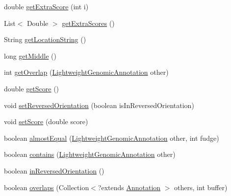 \begin{DoxyCompactItemize}
\item 
double \hyperlink{classbroad_1_1core_1_1annotation_1_1_basic_lightweight_annotation_a29f10b679f86820e035e1f8071ce552d}{get\+Extra\+Score} (int i)
\item 
List$<$ Double $>$ \hyperlink{classbroad_1_1core_1_1annotation_1_1_basic_lightweight_annotation_a2730f74d634af4832bc9a7c4071316cb}{get\+Extra\+Scores} ()
\item 
String \hyperlink{classbroad_1_1core_1_1annotation_1_1_basic_lightweight_annotation_a768a87c705c0f6abc1025dc776486cc9}{get\+Location\+String} ()
\item 
long \hyperlink{classbroad_1_1core_1_1annotation_1_1_basic_lightweight_annotation_ae3d92f493e84b236a38aac116bff28d3}{get\+Middle} ()
\item 
int \hyperlink{classbroad_1_1core_1_1annotation_1_1_basic_lightweight_annotation_a37f37590e75f2cbbb1268a59b8a686f5}{get\+Overlap} (\hyperlink{interfacebroad_1_1core_1_1annotation_1_1_lightweight_genomic_annotation}{Lightweight\+Genomic\+Annotation} other)
\item 
double \hyperlink{classbroad_1_1core_1_1annotation_1_1_basic_lightweight_annotation_a09f0b0f3e4eab4d2ed93ffeb7419646d}{get\+Score} ()
\item 
void \hyperlink{classbroad_1_1core_1_1annotation_1_1_basic_lightweight_annotation_a3db34c03b25ad0e5b0a7165e9c00b936}{set\+Reversed\+Orientation} (boolean is\+In\+Reversed\+Orientation)
\item 
void \hyperlink{classbroad_1_1core_1_1annotation_1_1_basic_lightweight_annotation_aeb06d309e53ec158338164b8945b9949}{set\+Score} (double score)
\item 
boolean \hyperlink{classbroad_1_1core_1_1annotation_1_1_basic_lightweight_annotation_a5e6e46ebe27fc102535d6d93aa6f5ac7}{almost\+Equal} (\hyperlink{interfacebroad_1_1core_1_1annotation_1_1_lightweight_genomic_annotation}{Lightweight\+Genomic\+Annotation} other, int fudge)
\item 
boolean \hyperlink{classbroad_1_1core_1_1annotation_1_1_basic_lightweight_annotation_a768dd90feef065f8b04a253c2d1c3e1e}{contains} (\hyperlink{interfacebroad_1_1core_1_1annotation_1_1_lightweight_genomic_annotation}{Lightweight\+Genomic\+Annotation} other)
\item 
boolean \hyperlink{classbroad_1_1core_1_1annotation_1_1_basic_lightweight_annotation_a1d9bc8dac1004a062ae4aca4c8cfbfba}{in\+Reversed\+Orientation} ()
\item 
boolean \hyperlink{classbroad_1_1core_1_1annotation_1_1_basic_lightweight_annotation_aaa261feb92b909750aa4c6b1484682ce}{overlaps} (Collection$<$?extends \hyperlink{interfaceumms_1_1core_1_1annotation_1_1_annotation}{Annotation} $>$ others, int buffer)

\end{DoxyCompactItemize}

